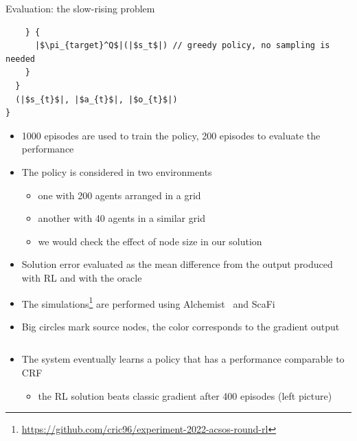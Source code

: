 \documentclass[8pt, aspectratio=169, handout]{beamer}
\begin{document}
\begin{frame}{Evaluation: the slow-rising problem}
\begin{card}
\begin{verbatim}
    } {
      |$\pi_{target}^Q$|(|$s_t$|) // greedy policy, no sampling is needed
    }
  }
  (|$s_{t}$|, |$a_{t}$|, |$o_{t}$|) 
}
    \end{verbatim}
  \end{card}
\framebreak
  \begin{card}
    \begin{itemize}
      \item 1000 episodes are used to train the policy, 200 episodes to evaluate the performance
      \item The policy is considered in two environments 
      \begin{itemize}
        \item one with 200 agents arranged in a grid
        \item another with 40 agents in a similar grid
        \item we would check the effect of node size in our solution
      \end{itemize}
      \item Solution error evaluated as the mean difference from the output produced with RL and with the oracle
      \item The simulations\footnote{\url{https://github.com/cric96/experiment-2022-acsos-round-rl}} are performed using Alchemist~\cite{alchemist-jos2013} and ScaFi~\cite{DBLP:conf/isola/CasadeiVAD20} 
      \item Big circles mark source nodes, the color corresponds to the gradient output
    \end{itemize}
  \end{card}  
  \begin{columns}
    \begin{column}{0.3\textwidth}
    \end{column}
    \begin{column}{0.38\textwidth}
    \end{column}  
  \end{columns}
  \begin{card}[Results]
    \begin{itemize}
      \item The system eventually learns a policy that has a performance comparable to CRF
      \begin{itemize}
        \item the RL solution beats classic gradient after 400 episodes (left picture)

\end{itemize}
\end{itemize}
\end{card}
\end{frame}
\end{document}
